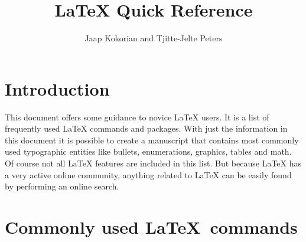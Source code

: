 \documentclass{article}
\title{\LaTeX{} Quick Reference}
\author{Jaap Kokorian and Tjitte-Jelte Peters}
\begin{document}
\maketitle
\tableofcontents

\newpage
\section{Introduction}\label{sec:introduction}

This document offers some guidance to novice \LaTeX{} users. It is a list of frequently used \LaTeX{} commands and packages. With just the information in this document it is possible to create a manuscript that contains most commonly used typographic entities like bullets, enumerations, graphics, tables and math. Of course not all \LaTeX{} features are included in this list. But because \LaTeX{} has a very active online community, anything related to \LaTeX{} can be easily found by performing an online search.

\section{Commonly used \LaTeX~commands}
\end{document}
